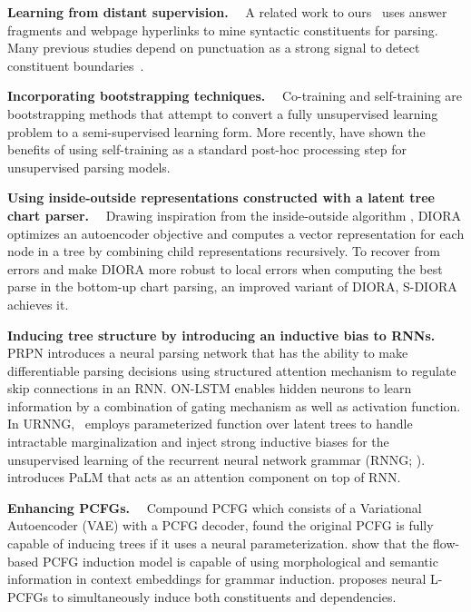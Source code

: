\documentclass[11pt]{article}
\newcommand{\para}[1]{\vskip 1mm\noindent\textbf{#1}~~}
\begin{document}
\para{Learning from distant supervision.} A related work to ours~\citep{shi-etal-2021-learning} uses answer fragments and webpage hyperlinks to mine syntactic constituents for parsing. Many previous studies depend on punctuation as a strong signal to detect constituent boundaries~\citep{spitkovsky-etal-2013-breaking,parikh-etal-2014-spectral}.

\para{Incorporating bootstrapping techniques.} Co-training \citep{yarowsky-1995-unsupervised,10.1145/279943.279962,abney2007self} and self-training \citep{steedman-etal-2003-bootstrapping,mcclosky-etal-2006-effective,cohen-smith-2010-viterbi} are bootstrapping methods that attempt to convert a fully unsupervised learning problem to a semi-supervised learning form. More recently, \citet{mohananey-etal-2020-self, shi-etal-2020-role, steedman-etal-2003-bootstrapping} have shown the benefits of using self-training as a standard post-hoc processing step for unsupervised parsing models.

\para{Using inside-outside representations constructed with a latent tree chart parser.} Drawing inspiration from the inside-outside algorithm \citep{Baker:79}, DIORA \citep{drozdov-etal-2019-unsupervised} optimizes an autoencoder objective and computes a vector representation for each node in a tree by combining child representations recursively. To recover from errors and make DIORA more robust to local errors when computing the best parse in the bottom-up chart parsing, an improved variant of DIORA, S-DIORA \citep{drozdov-etal-2020-unsupervised} achieves it.

\para{Inducing tree structure by introducing an inductive bias to RNNs.} PRPN \citep{shen2018neural} introduces a neural parsing network that has the ability to make differentiable parsing decisions using structured attention mechanism to regulate skip connections in an RNN. ON-LSTM \citep{shen2018ordered} enables hidden neurons to learn information by a combination of gating mechanism as well as activation function. In URNNG,~\citet{kim-etal-2019-unsupervised} employs parameterized function over latent trees to handle intractable marginalization and inject strong inductive biases for the unsupervised learning of the recurrent neural network grammar (RNNG; \citealt{dyer-etal-2016-recurrent}). \citet{peng-etal-2019-palm} introduces PaLM that acts as an attention component on top of RNN.


\para{Enhancing PCFGs.} Compound PCFG \citep{kim-etal-2019-compound} which consists of a Variational Autoencoder (VAE) with a PCFG decoder, found the original PCFG is fully capable of inducing trees if it uses a neural parameterization. \citet{jin-etal-2019-unsupervised} show that the flow-based PCFG induction model is capable of using morphological and semantic information in context embeddings for grammar induction. \citet{zhu-etal-2020-return} proposes neural L-PCFGs to simultaneously induce both constituents and dependencies.
\end{document}
